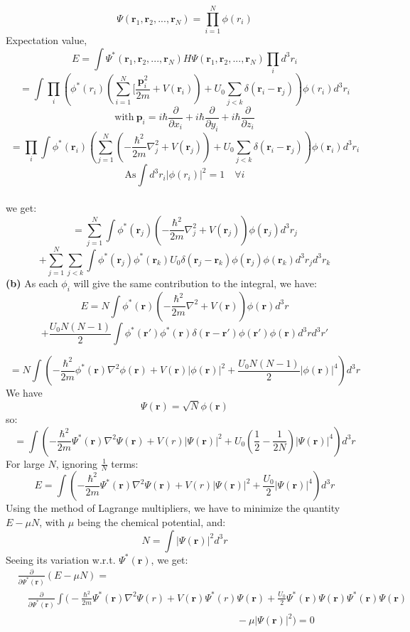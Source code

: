 \documentclass{article}
\begin{document}
\[
\Psi(\mathbf{r}_1,\mathbf{r}_2,...,\mathbf{r}_N)=\prod_{i=1}^N\phi(r_i)
\]
Expectation value,
\[
 E= \int \Psi^*(\mathbf{r}_1,\mathbf{r}_2,...,\mathbf{r}_N)H\Psi(\mathbf{r}_1,\mathbf{r}_2,...,\mathbf{r}_N)\prod_i d^3r_i
\]
\[
=\int \prod_i \left( \phi^*(r_i) \left( \sum_{i=1}^N[\frac{\mathbf{p}_i^2}{2m}+V(\mathbf{r}_i) \right) + U_0 \sum_{j<k} \delta(\mathbf{r}_i-\mathbf{r}_j) \right) \phi(r_i) d^3r_i
\]
\[
\text{with}~
\mathbf{p}_i = i\hbar \frac{\partial}{\partial x_i} + i\hbar \frac{\partial}{\partial y_i} + i\hbar \frac{\partial}{\partial z_i}
\]
\[
= \prod_i \int \phi^*(\mathbf{r}_i) \left( \sum_{j=1}^{N} \left( -\frac{\hbar^2}{2m} \nabla_j^2 + V(\mathbf{r}_j) \right) + U_0 \sum_{j<k} \delta(\mathbf{r}_i-\mathbf{r}_j) \right) \phi(\mathbf{r}_i) d^3r_i
\]
\[\text{As} \int d^3r_i |\phi(r_i)|^2 = 1 \quad \forall i\]\\
we get:
\[
= \sum_{j=1}^{N} \int \phi^*(\mathbf{r}_j) \left( -\frac{\hbar^2}{2m} \nabla_j^2 + V(\mathbf{r}_j) \right) \phi(\mathbf{r}_j) d^3r_j
\]
\[
+ \sum_{j=1}^N\sum_{j<k} \int \phi^*(\mathbf{r}_j) \phi^*(\mathbf{r}_k) U_0 \delta(\mathbf{r}_j - \mathbf{r}_k) \phi(\mathbf{r}_j) \phi(\mathbf{r}_k) d^3r_j d^3r_k
\]
\textbf{(b)} As each $\phi_i$ will give the same contribution to the integral, we have:
\[
E = N \int \phi^*(\mathbf{r}) \left( -\frac{\hbar^2}{2m} \nabla^2 + V(\mathbf{r}) \right) \phi(\mathbf{r}) d^3r
\]
\[
+ \frac{U_0 N(N-1)}{2} \int \phi^*(\mathbf{r}') \phi^*(\mathbf{r}) \delta(\mathbf{r} - \mathbf{r}') \phi(\mathbf{r}') \phi(\mathbf{r}) d^3r d^3r'
\]

\[
= N \int \left( -\frac{\hbar^2}{2m} \phi^*(\mathbf{r})\nabla^2 \phi(\mathbf{r}) + V(\mathbf{r}) |\phi(\mathbf{r})|^2 + \frac{U_0 N(N-1)}{2} |\phi(\mathbf{r})|^4 \right) d^3r
\]
We have 
\[
\Psi(\mathbf{r}) = \sqrt{N} \phi(\mathbf{r})
\]
so:
\[
= \int \left( -\frac{\hbar^2}{2m} \Psi^*(\mathbf{r})\nabla^2 \Psi(\mathbf{r}) + V(r) |\Psi(\mathbf{r})|^2 + U_0 \left(\frac{1}{2} - \frac{1}{2N} \right) |\Psi(\mathbf{r})|^4 \right) d^3r
\]
For large $N$, ignoring $\frac{1}{N}$ terms:
\[
E = \int \left( -\frac{\hbar^2}{2m} \Psi^*(\mathbf{r})\nabla^2 \Psi(\mathbf{r}) + V(r) |\Psi(\mathbf{r})|^2 + \frac{U_0}{2} |\Psi(\mathbf{r})|^4 \right) d^3r
\]
Using the method of Lagrange multipliers, we have to minimize the quantity $E - \mu N$, with $\mu$ being the chemical potential, and:
\[
N = \int |\Psi(\mathbf{r})|^2 d^3r
\]
Seeing its variation w.r.t. $\Psi^*(\mathbf{r})$, we get:
\begin{align*}
&\frac{\partial}{\partial \Psi^*(\mathbf{r})} \left( E - \mu N \right) =\\
&\quad \frac{\partial}{\partial \Psi^*(\mathbf{r})} \int \Big( -\frac{\hbar^2}{2m} \Psi^*(\mathbf{r})\nabla^2 \Psi(r) + V(\mathbf{r})\Psi^*(r)\Psi(\mathbf{r}) + \frac{U_0}{2}\Psi^*(\mathbf{r})\Psi(\mathbf{r})\Psi^*(\mathbf{r})\Psi(\mathbf{r})\\
& \qquad \qquad \qquad \qquad \qquad \qquad \qquad \qquad \qquad \qquad \qquad- \mu |\Psi(\mathbf{r})|^2 \Big) = 0
\end{align*}
\end{document}
